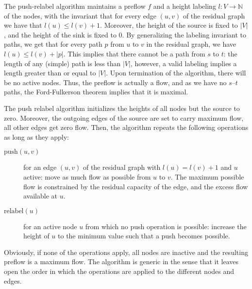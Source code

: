 \documentclass[smallcondensed]{svjour3}     %
\begin{document}
  The push-relabel algorithm maintains a preflow $f$ and a height labeling $l: V \to \mathbb {N}$ of the nodes, 
  with the invariant that for every edge $(u, v)$ of the residual graph we have that $l(u) \le l(v) + 1$. 
  Moreover, the height of the source is fixed to $\left\vert{V}\right\vert$, and the height of the sink is fixed to $0$.
  By generalizing the labeling invariant to paths, we get that for every path $p$ from $u$ to $v$ in the residual graph, we have $l(u) \le l(v) + |p|$.
  This implies that there cannot be a path from $s$ to $t$: the length of any (simple) path is less than $|V|$, however, a valid labeling 
  implies a length greater than or equal to $|V|$. Upon termination of the algorithm, there will be no active nodes. 
  Thus, the preflow is actually a flow, and as we have no $s$--$t$ paths, the Ford-Fulkerson theorem implies that it is maximal.
  
  The push relabel algorithm initializes the heights of all nodes but the source to zero. Moreover, the outgoing edges of the source are 
  set to carry maximum flow, all other edges get zero flow. Then, the algorithm repeats the following operations as long as they apply:
  \begin{description}
    \item[$\textrm{push}(u,v)$] for an edge $(u,v)$ of the residual graph with $l(u) = l(v)+1$ and $u$ active: move as much flow as possible from $u$ to $v$.
    The maximum possible flow is constrained by the residual capacity of the edge, and the excess flow available at $u$.
    \item[$\textrm{relabel}(u)$] for an active node $u$ from which no push operation is possible: increase the height of $u$ to the minimum value such that a push
      becomes possible.
  \end{description}
  Obviously, if none of the operations apply, all nodes are inactive and the resulting preflow is a maximum flow.
  The algorithm is generic in the sense that it leaves open the order in which the operations are applied to the different nodes and edges.
  
\end{document}
